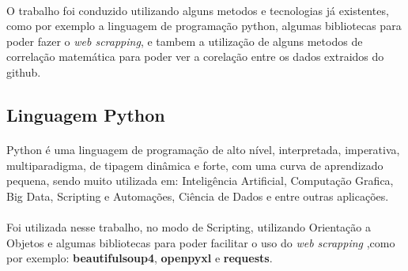 \paragraph{}
O trabalho foi conduzido utilizando alguns metodos e tecnologias já existentes, como por exemplo a linguagem de programação python,
algumas bibliotecas para poder fazer o \textit{web scrapping}, e tambem a utilização de alguns metodos de correlação matemática para
poder ver a corelação entre os dados extraidos do github. 

\subsection{Linguagem Python}

\paragraph{}
Python é uma linguagem de programação de alto nível, interpretada, imperativa, multiparadigma, de tipagem dinâmica e forte, com uma
curva de aprendizado pequena, sendo muito utilizada em: Inteligência Artificial, Computação Grafica, Big Data, Scripting e Automações,
Ciência de Dados e entre outras aplicações.

\paragraph{}
Foi utilizada nesse trabalho, no modo de Scripting, utilizando Orientação a Objetos e algumas bibliotecas para poder facilitar o uso do \textit{web scrapping} ,como por exemplo: \textbf{beautifulsoup4}, \textbf{openpyxl} e \textbf{requests}.

